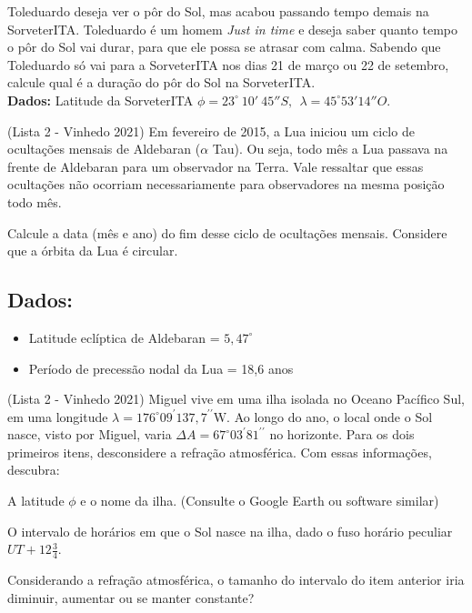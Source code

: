 \documentclass[11pt]{article}
\begin{document}
\begin{pproblem}
    Toleduardo deseja ver o pôr do Sol, mas acabou passando tempo demais na SorveterITA. Toleduardo é um homem \textit{Just in time} e deseja saber quanto tempo o pôr do Sol vai durar, para que ele possa se atrasar com calma. Sabendo que Toleduardo só vai para a SorveterITA nos dias 21 de março ou 22 de setembro, calcule qual é a duração do pôr do Sol na SorveterITA.
    \\
    \textbf{Dados: } Latitude da SorveterITA \(\phi = 23^\circ \ 10' \ 45''S, \ \ \lambda = 45^\circ 53' 14''O\).
\end{pproblem}


\begin{pproblem} (Lista 2 - Vinhedo 2021)
    Em fevereiro de 2015, a Lua iniciou um ciclo de ocultações mensais de Aldebaran ($\alpha$ Tau). Ou seja, todo mês a Lua passava na frente de Aldebaran para um observador na Terra. Vale ressaltar que essas ocultações não ocorriam necessariamente para observadores na mesma posição todo mês. 

    Calcule a data (mês e ano) do fim desse ciclo de ocultações mensais. Considere que a órbita da Lua é circular.

    \subsection*{Dados:}

    \begin{itemize}
        \item Latitude eclíptica de Aldebaran = $5,47^\circ$
        \item Período de precessão nodal da Lua = 18,6 anos
    \end{itemize}
\end{pproblem}


\begin{pproblem} (Lista 2 - Vinhedo 2021)
    Miguel vive em uma ilha isolada no Oceano Pacífico Sul, em uma longitude
    $\lambda = 176^{\circ}09^{\prime}137,7^{\prime\prime}\text{W}$. Ao longo do ano, o local onde o Sol nasce, visto por Miguel, varia $\Delta A = 67^{\circ}03^{\prime}81^{\prime\prime}$ no horizonte. Para os dois primeiros itens, desconsidere a refração atmosférica. Com essas informações, descubra:

    \begin{alternativas}
        \item A latitude $\phi$ e o nome da ilha. (Consulte o Google Earth ou software similar)
        \item O intervalo de horários em que o Sol nasce na ilha, dado o fuso horário peculiar $UT + 12\frac{3}{4}$.
        \item Considerando a refração atmosférica, o tamanho do intervalo do item anterior iria diminuir, aumentar ou se manter constante?
    \end{alternativas}

\end{pproblem}
\end{document}
